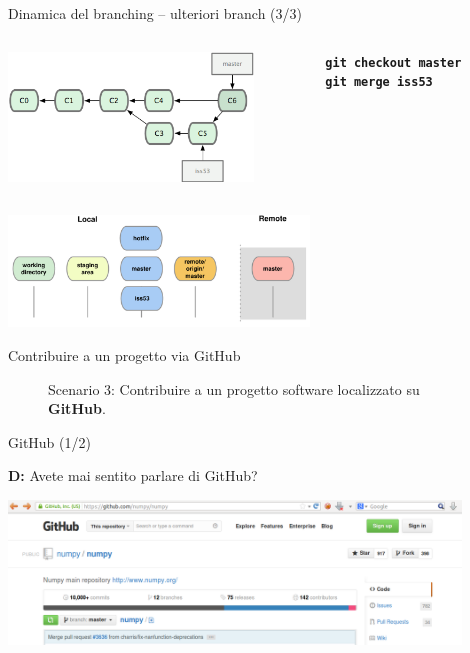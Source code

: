 \documentclass{beamer}
\begin{document}
\begin{frame}{\centerline{Dinamica del branching -- ulteriori branch (3/3)}}
  \begin{columns}
    \begin{column}{0.6\linewidth}
      \begin{center}
        \includegraphics[width=6.5cm]{UniBo.IDSEPC.A2023.LavoroCondiviso/18333fig0317-tn}
      \end{center}
    \end{column}
    \begin{column}{0.45\linewidth}
      \begin{center}
        \texttt{\textbf{git checkout master}}\\
        \texttt{\textbf{git merge iss53}}
      \end{center}
    \end{column}
  \end{columns}
  \begin{center}
    \includegraphics[width=8cm]{UniBo.IDSEPC.A2023.LavoroCondiviso/git-branch2}
  \end{center}
\end{frame}


\begin{frame}{\centerline{Contribuire a un progetto via GitHub}}
  \begin{figure}
    \centering
    Scenario 3: Contribuire a un progetto software localizzato su
    \textbf{GitHub}.
  \end{figure}
\end{frame}

\begin{frame}{\centerline{GitHub (1/2)}}
  \textbf{D:} Avete mai sentito parlare di GitHub?
  \begin{center}
      
  \includegraphics[width=12cm]{UniBo.IDSEPC.A2023.LavoroCondiviso/github}
    \end{center}

\end{frame}
\end{document}
